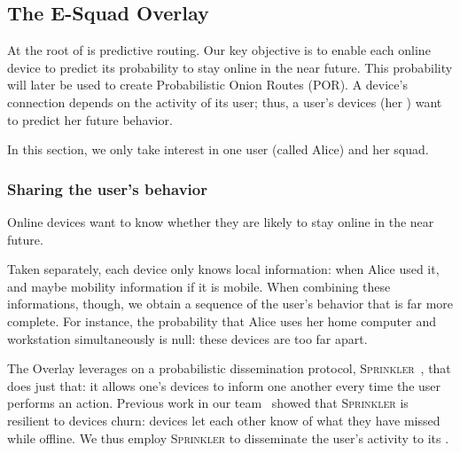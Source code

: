 \subsection{The E-Squad Overlay} 
\label{sec:squad_overlay}

At the root of \name is predictive routing.
Our key objective is to enable each online device to predict its probability to stay online in the near future.
This probability will later be used to create Probabilistic Onion Routes (POR).
A device's connection depends on the activity of its user; thus, a user's 
devices (her \squad) want to predict her future behavior.

In this section, we only take interest in one user (called Alice) and her squad.



\subsubsection{Sharing the user's behavior} %
\label{sub:sharing_knowledge}

Online devices want to know whether they are likely to stay online in the near future.

Taken separately, each device only knows local information: when Alice used it, and maybe mobility information if it is mobile.
When combining these informations, though, we obtain a sequence of the user's behavior that is far more complete.
For instance, the probability that Alice uses her home computer and workstation simultaneously is null: these devices are too far apart.

The \squad Overlay leverages on a probabilistic dissemination protocol, \textsc{Sprinkler}~\cite{luxey:hal-01704172}, that does just that: 
it allows one's devices to inform one another every time the user performs an action.
Previous work in our team~\cite{luxey:cascade} showed that \textsc{Sprinkler} is resilient to devices churn: 
devices let each other know of what they have missed while offline.
We thus employ \textsc{Sprinkler} to disseminate the user's activity to its \squad.

